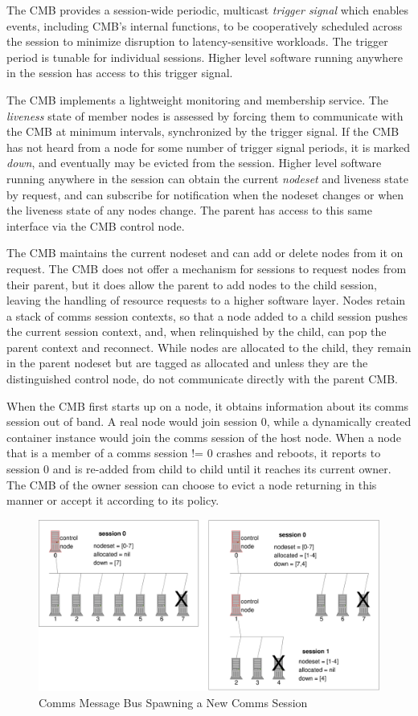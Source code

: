 The CMB provides a session-wide periodic, multicast {\em trigger signal}
which enables events, including CMB's internal functions, to be cooperatively
scheduled across the session to minimize disruption to latency-sensitive
workloads.  The trigger period is tunable for individual sessions.
Higher level software running anywhere in the session has access to
this trigger signal.

The CMB implements a lightweight monitoring and membership service.
The {\em liveness} state of member nodes is assessed by forcing
them to communicate with the CMB at minimum intervals,
synchronized by the trigger signal.
If the CMB has not heard from a node for some number
of trigger signal periods, it is marked {\em down}, and eventually may
be evicted from the session.  Higher level software running anywhere in
the session can obtain the current {\em nodeset} and liveness state
by request, and can subscribe for notification when the nodeset changes
or when the liveness state of any nodes change.
The parent has access to this same interface via the CMB control node.

The CMB maintains the current nodeset and can add or delete nodes
from it on request.  The CMB does not offer a mechanism for sessions
to request nodes from their parent, but it does allow the parent
to add nodes to the child session, leaving the handling of resource
requests to a higher software layer.  Nodes retain a stack of comms
session contexts, so that a node added to a child session pushes the current
session context, and, when relinquished by the child, can pop the parent
context and reconnect.
While nodes are allocated to the child, they remain in the parent nodeset
but are tagged as allocated and unless they are the distinguished control
node, do not communicate directly with the parent CMB.

When the CMB first starts up on a node, it obtains information about its
comms session out of band.
A real node would join session 0, while a dynamically created
container instance would join the comms session of the host node.
When a node that is a member of a comms session != 0 crashes and
reboots, it reports to session 0 and is re-added from child to
child until it reaches its current owner.  The CMB of the owner session
can choose to evict a node returning in this manner or accept it
according to its policy.

\begin{figure}
\centering
\includegraphics[scale=0.50]{../fig/cmb.eps}
\caption{Comms Message Bus Spawning a New Comms Session}
\label{FigCMBSpawn}
\end{figure}

